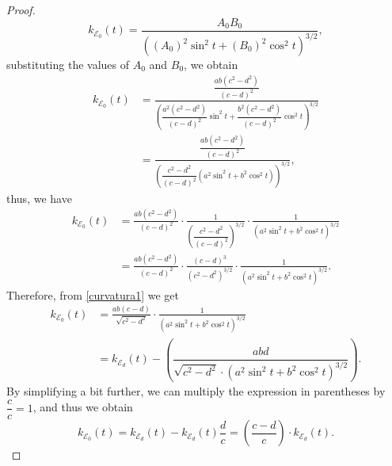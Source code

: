 \documentclass[10pt,a4paper]{amsart}
\begin{document}
\begin{proof}
	$$
	k_{\mathcal{E}_0}(t) = \frac{A_0 B_0}{\left( (A_0)^2 \sin^2 t + (B_0)^2 \cos^2 t \right)^{3/2}},
	$$
	substituting the values of $A_0$ and $B_0$, we obtain
	\begin{align*}
		k_{\mathcal{E}_0}(t) &= \frac{\dfrac{ab(c^2 - d^2)}{(c - d)^2}}{\left( \dfrac{a^2(c^2 - d^2)}{(c - d)^2}\sin^2 t + \dfrac{b^2(c^2 - d^2)}{(c - d)^2}\cos^2 t \right)^{3/2}}\\
		&=  \frac{\dfrac{ab(c^2 - d^2)}{(c - d)^2}}{\left( \dfrac{c^2 - d^2}{(c - d)^2} (a^2 \sin^2 t + b^2 \cos^2 t) \right)^{3/2}},
	\end{align*}
	thus, we have
	\begin{align*}
		k_{\mathcal{E}_0}(t) &= \frac{ab(c^2 - d^2)}{(c - d)^2} \cdot \frac{1}{\left( \dfrac{c^2 - d^2}{(c - d)^2} \right)^{3/2}} \cdot \frac{1}{(a^2 \sin^2 t + b^2 \cos^2 t)^{3/2}}\\
		&= \frac{ab(c^2 - d^2)}{(c - d)^2} \cdot \frac{(c - d)^3}{(c^2 - d^2)^{3/2}} \cdot \frac{1}{(a^2 \sin^2 t + b^2 \cos^2 t)^{3/2}}.
	\end{align*}
	Therefore, from \eqref{curvatura1} we get 
	\begin{align*}
		k_{\mathcal{E}_0}(t) &= \frac{ab(c - d)}{\sqrt{c^2 - d^2}} \cdot \frac{1}{(a^2 \sin^2 t + b^2 \cos^2 t)^{3/2}}\\
		& = k_{\mathcal{E}_d}(t) - \left(  \dfrac{abd}{\sqrt{c^2 - d^2} \cdot (a^2 \sin^2 t + b^2 \cos^2 t)^{3/2} } \right).
	\end{align*}
	By simplifying a bit further, we can multiply the expression in parentheses by $\dfrac{c}{c} = 1$, and thus we obtain
	$$
	k_{\mathcal{E}_0}(t) = k_{\mathcal{E}_d}(t) - k_{\mathcal{E}_d}(t)\frac{d}{c} = \left(\frac{c-d}{c}\right) \cdot k_{\mathcal{E}_d}(t).
	$$
	
\end{proof}
\end{document}
